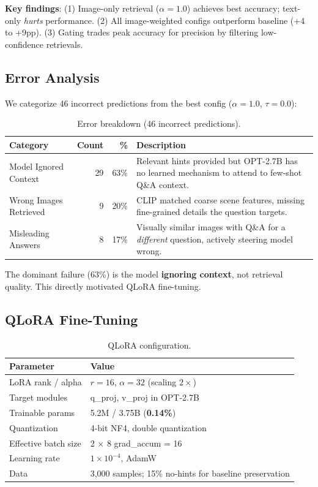 \documentclass[12pt, a4paper]{article}
\begin{document}
\textbf{Key findings}: (1) Image-only retrieval ($\alpha{=}1.0$) achieves best accuracy; text-only \emph{hurts} performance. (2) All image-weighted configs outperform baseline (+4 to +9pp). (3) Gating trades peak accuracy for precision by filtering low-confidence retrievals.

\subsection{Error Analysis}

We categorize 46 incorrect predictions from the best config ($\alpha{=}1.0$, $\tau{=}0.0$):

\begin{table}[H]
\centering
\caption{Error breakdown (46 incorrect predictions).}
\renewcommand{\arraystretch}{1.3}
\begin{tabular}{@{} l r r p{7cm} @{}}
\toprule
\textbf{Category} & \textbf{Count} & \textbf{\%} & \textbf{Description} \\
\midrule
Model Ignored Context & 29 & 63\% & Relevant hints provided but OPT-2.7B has no learned mechanism to attend to few-shot Q\&A context. \\
Wrong Images Retrieved & 9 & 20\% & CLIP matched coarse scene features, missing fine-grained details the question targets. \\
Misleading Answers & 8 & 17\% & Visually similar images with Q\&A for a \emph{different} question, actively steering model wrong. \\
\bottomrule
\end{tabular}
\end{table}

The dominant failure (63\%) is the model \textbf{ignoring context}, not retrieval quality. This directly motivated QLoRA fine-tuning.

\subsection{QLoRA Fine-Tuning}

\begin{table}[H]
\centering
\caption{QLoRA configuration.}
\renewcommand{\arraystretch}{1.3}
\begin{tabular}{@{} l l @{}}
\toprule
\textbf{Parameter} & \textbf{Value} \\
\midrule
LoRA rank / alpha & $r{=}16$, $\alpha{=}32$ (scaling $2\times$) \\
Target modules & q\_proj, v\_proj in OPT-2.7B \\
Trainable params & 5.2M / 3.75B (\textbf{0.14\%}) \\
Quantization & 4-bit NF4, double quantization \\
Effective batch size & 2 $\times$ 8 grad\_accum = 16 \\
Learning rate & $1 \times 10^{-4}$, AdamW \\
Data & 3,000 samples; 15\% no-hints for baseline preservation \\
\bottomrule
\end{tabular}
\end{table}
\end{document}
